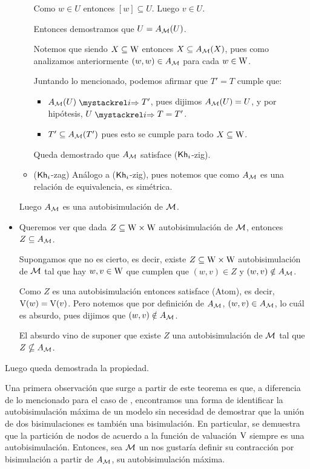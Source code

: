 \begin{demostracion}
\begin{itemize}
\begin{itemize}
            Como $w \in U$ entonces $[w] \subseteq U$. Luego $v \in U$.

            Entonces demostramos que $U = A_{\mathcal{M}}(U)$.

            Notemos que siendo $X \subseteq \mathrm{W}$ entonces $X \subseteq A_{\mathcal{M}}(X)$, pues como analizamos anteriormente 
            $(w,w) \in A_{\mathcal{M}}$ para cada $w \in \mathrm{W}$.

            Juntando lo mencionado, podemos afirmar que $T' = T$ cumple que:

             \begin{itemize}
                \item $A_\model(U) \ultsExecAgi T'$, pues dijimos $A_{\mathcal{M}}(U) = U$, y por hipótesis, $U \ultsExecAgi T = T'$.  
                \item $T' \subseteq A_{\mathcal{M}}(T')$ pues esto se cumple para todo $X \subseteq \mathrm{W}$.
            \end{itemize}
            Queda demostrado que $A_{\mathcal{M}}$ satisface ($\mathsf{Kh}_i$-zig).

            \item ($\mathsf{Kh}_i$-zag) Análogo a ($\mathsf{Kh}_i$-zig), pues notemos que como $A_{\mathcal{M}}$ es una relación de equivalencia, es simétrica.
        \end{itemize}

        Luego $A_{\mathcal{M}}$ es una autobisimulación de $\mathcal{M}$.
        
        \item Queremos ver que dada $Z \subseteq \mathrm{W} \times \mathrm{W}$ autobisimulación de $\mathcal{M}$, entonces $Z \subseteq A_{\mathcal{M}}$.
        
        Supongamos que no es cierto, es decir, existe $Z \subseteq \mathrm{W} \times \mathrm{W}$ autobisimulación de $\mathcal{M}$ tal que hay 
        $w,v \in \mathrm{W}$ que cumplen que $(w,v) \in Z$ y $(w,v) \notin A_{\mathcal{M}}$. 

        Como $Z$ es una autobisimulación entonces satisface (Atom), es decir, $\mathrm{V}(w) = \mathrm{V}(v)$. Pero notemos que por definición de 
        $A_{\mathcal{M}}$, $(w,v) \in A_{\mathcal{M}}$, lo cuál es absurdo, pues dijimos que $(w,v) \notin A_{\mathcal{M}}$.

        El absurdo vino de suponer que existe $Z$ una autobisimulación de $\mathcal{M}$ tal que $Z \nsubseteq A_{\mathcal{M}}$.    
    \end{itemize}
    Luego queda demostrada la propiedad.
\end{demostracion}

Una primera observación que surge a partir de este teorema es que, a diferencia de lo mencionado para el caso de \bml, 
encontramos una forma de identificar la autobisimulación máxima de un modelo sin necesidad de demostrar que la unión de 
dos bisimulaciones es también una bisimulación. En particular, se demuestra que la partición de nodos de acuerdo a la función 
de valuación $\mathrm{V}$ siempre es una autobisimulación. Entonces, sea $\mathcal{M}$ un \ults nos gustaría definir su contracción por bisimulación a partir de $A_{\mathcal{M}}$, 
su autobisimulación máxima.

